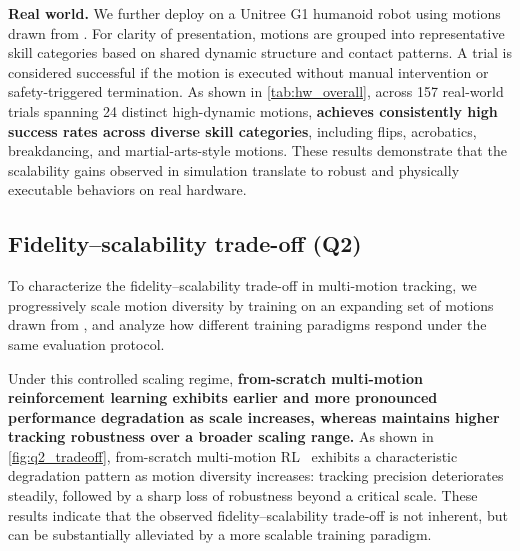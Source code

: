 \textbf{Real world.}
We further deploy \model on a Unitree G1 humanoid robot using
motions drawn from \dataset. For clarity of presentation, motions are grouped into representative skill categories based on shared dynamic structure and contact patterns. A trial is considered successful if the motion is executed without manual
intervention or safety-triggered termination.
As shown in \cref{tab:hw_overall}, across 157 real-world trials spanning 24 distinct
high-dynamic motions,  \textbf{\model achieves consistently high success rates across diverse
skill categories}, including flips, acrobatics, breakdancing, and martial-arts-style
motions.
These results demonstrate that the scalability gains observed in simulation translate
to robust and physically executable behaviors on real hardware.

\subsection{Fidelity--scalability trade-off (Q2)}
\label{sec:q2_tradeoff}

To characterize the fidelity--scalability trade-off in multi-motion tracking, we progressively scale motion diversity by training on an expanding set of motions
drawn from \dataset, and analyze how different training paradigms respond under the
same evaluation protocol.

Under this controlled scaling regime, \textbf{from-scratch multi-motion reinforcement learning
exhibits earlier and more pronounced performance degradation as scale increases,
whereas \model maintains higher tracking robustness over a broader scaling range. }As shown in \cref{fig:q2_tradeoff}, from-scratch multi-motion RL~\cite{liao2025beyondmimic}
exhibits a characteristic degradation pattern as motion diversity increases:
tracking precision deteriorates steadily, followed by a sharp loss of robustness beyond
a critical scale. These results indicate that the observed fidelity--scalability trade-off is not inherent,
but can be substantially alleviated by a more scalable training paradigm.

